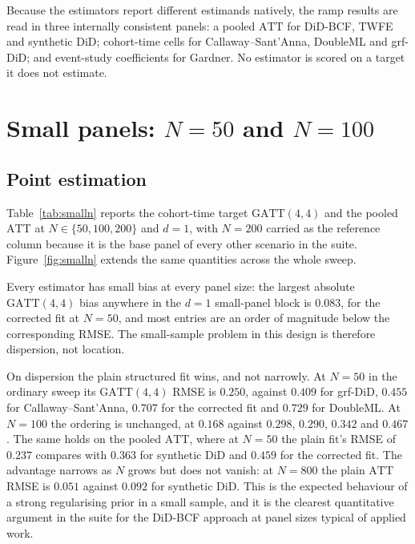 \documentclass[11pt]{article}
\newcommand{\att}{\mathrm{ATT}}
\newcommand{\gatt}{\mathrm{GATT}}
\begin{document}
Because the estimators report different estimands natively, the ramp results
are read in three internally consistent panels: a pooled $\att$ for DiD-BCF,
TWFE and synthetic DiD; cohort-time cells for Callaway--Sant'Anna, DoubleML
and grf-DiD; and event-study coefficients for Gardner. No estimator is scored
on a target it does not estimate.

\section{Small panels: $N=50$ and $N=100$}

\subsection{Point estimation}

Table~\ref{tab:smalln} reports the cohort-time target $\gatt(4,4)$ and the
pooled $\att$ at $N\in\{50,100,200\}$ and $d=1$, with $N=200$ carried as the
reference column because it is the base panel of every other scenario in the
suite. Figure~\ref{fig:smalln} extends the same quantities across the whole
sweep.

Every estimator has small bias at every panel size: the largest absolute
$\gatt(4,4)$ bias anywhere in the $d=1$ small-panel block is $0.083$, for the
corrected fit at $N=50$, and most entries are an order of magnitude below the
corresponding RMSE. The small-sample problem in this design is therefore
dispersion, not location.

On dispersion the plain structured fit wins, and not narrowly. At $N=50$ in
the ordinary sweep its $\gatt(4,4)$ RMSE is $0.250$, against $0.409$ for
grf-DiD, $0.455$ for Callaway--Sant'Anna, $0.707$ for the corrected fit and
$0.729$ for DoubleML. At $N=100$ the ordering is unchanged, at $0.168$ against
$0.298$, $0.290$, $0.342$ and $0.467$. The same holds on the pooled $\att$,
where at $N=50$ the plain fit's RMSE of $0.237$ compares with $0.363$ for
synthetic DiD and $0.459$ for the corrected fit. The advantage narrows as $N$
grows but does not vanish: at $N=800$ the plain $\att$ RMSE is $0.051$ against
$0.092$ for synthetic DiD. This is the expected behaviour of a strong
regularising prior in a small sample, and it is the clearest quantitative
argument in the suite for the DiD-BCF approach at panel sizes typical of
applied work.
\end{document}
